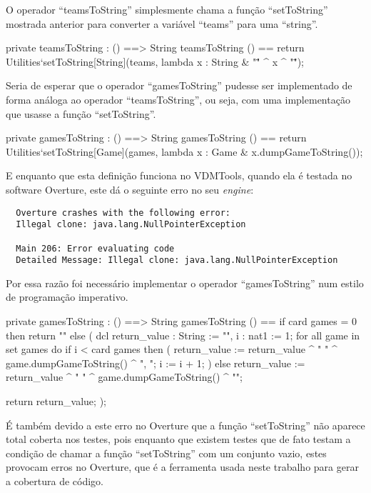 O operador ``teamsToString'' simplesmente chama a função
``setToString'' mostrada anterior para converter a variável ``teams''
para uma ``string''.

\begin{vdm_al}
  private teamsToString : () ==> String
    teamsToString () ==
      return Utilities`setToString[String](teams,
        lambda x : String & "\"" ^ x ^ "\"");
\end{vdm_al}

Seria de esperar que o operador ``gamesToString'' pudesse ser
implementado de forma análoga ao operador ``teams\-ToString'', ou seja,
com uma implementação que usasse a função ``setToString''.

\begin{vdm_al}
  private gamesToString : () ==> String
  gamesToString () ==
    return Utilities`setToString[Game](games, lambda x : Game & x.dumpGameToString());
\end{vdm_al}

E enquanto que esta definição funciona no VDMTools, quando ela é
testada no software Overture, este dá o seguinte erro no seu
\emph{engine}:

\begin{verbatim}
  Overture crashes with the following error:
  Illegal clone: java.lang.NullPointerException

  Main 206: Error evaluating code
  Detailed Message: Illegal clone: java.lang.NullPointerException
\end{verbatim}

Por essa razão foi necessário implementar o operador ``gamesToString''
num estilo de programação imperativo.

\begin{vdm_al}
  private gamesToString : () ==> String
  gamesToString () ==
    if card games = 0 then return "{}"
    else (
      dcl return_value : String := "{",
        i : nat1 := 1;
      for all game in set games do
        if i < card games then (
          return_value := return_value  ^ " " ^ game.dumpGameToString() ^ ", ";
          i := i + 1;
        )
        else
          return_value := return_value ^ " " ^ game.dumpGameToString() ^ "}";

      return return_value;
   );
\end{vdm_al}

É também devido a este erro no Overture que a função ``setToString''
não aparece total coberta nos testes, pois enquanto que existem testes
que de fato testam a condição de chamar a função ``setToString'' com
um conjunto vazio, estes provocam erros no Overture, que é a
ferramenta usada neste trabalho para gerar a cobertura de código. 


